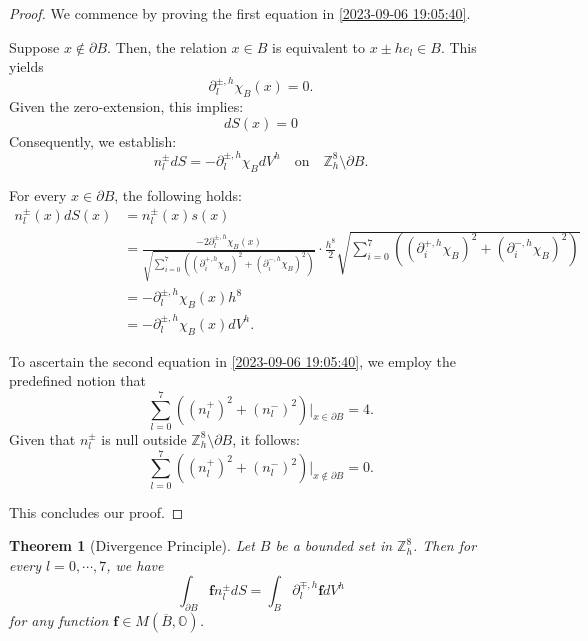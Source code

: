 \documentclass{amsart}
\newtheorem{theorem}{Theorem}[section]
\theoremstyle{definition}
\theoremstyle{remark}
\numberwithin{equation}{section}
\newcommand{\p}{\partial}
\newcommand{\OO}{\mathbb O}
\newcommand{\Z}{\mathbb Z}
\newcommand{\f}{\bm{f}}
\begin{document}
\begin{proof}
	We commence by proving the first equation in \eqref{2023-09-06 19:05:40}.
	
	Suppose $x \notin \p B$. Then, the relation $x \in B$ is equivalent to $x \pm he_l \in B$. This yields
	\begin{equation*}
		\p_l^{\pm,h} \chi_B(x) = 0.
	\end{equation*}
	Given the zero-extension, this implies:
	\begin{equation*}
		dS(x) = 0
	\end{equation*}
	Consequently, we establish:
	\begin{equation*}
		n_l^{\pm} dS = -\p_l^{\pm,h } \chi_B dV^h \quad \text{on} \quad \Z_h^8\setminus \p B.
	\end{equation*}
	
	For every $x \in \p B$, the following holds:
	\begin{align*}
		n_l^{\pm}(x)dS(x) &= n_l^{\pm}(x)s(x) \\
		&= \frac{-2\p_l^{\pm,h} \chi_B(x)}{\sqrt{\sum_{i=0}^{7} \left( (\p_i^{+,h}\chi_B)^2 + (\p_i^{-,h}\chi_B)^2 \right)}} \cdot \frac{h^8}{2}\sqrt{\sum_{i=0}^{7} \left( (\p_i^{+,h}\chi_B)^2 + (\p_i^{-,h}\chi_B)^2 \right)} \\
		&= -\p_l^{\pm,h}\chi_B(x)h^8 \\
		&= -\p_l^{\pm,h}\chi_B(x) dV^h.
	\end{align*}
	
	To ascertain the second equation in \eqref{2023-09-06 19:05:40}, we employ the predefined notion that
	\begin{equation*}
		\sum_{l=0}^{7} \left( (n_l^+)^2 + (n_l^-)^2 \right) \bigg|_{x\in \p B} = 4.
	\end{equation*}
	Given that $n_l^\pm$ is null outside $\Z^8_h\setminus \p B$, it follows:
	\begin{equation*}
		\sum_{l=0}^{7} \left( (n_l^+)^2 + (n_l^-)^2 \right) \bigg|_{x\notin \p B} = 0.
	\end{equation*}
	
	This concludes our proof.
\end{proof}






\begin{theorem}[Divergence Principle]\label{2023-09-06 21:25:07}
Let $B$ be a bounded set in  $\Z^8_h$. Then for every   $l=0,\cdots,7$, we have
	\begin{equation}
		\label{2023-09-06 20:18:53}
		\int_{\p B} \f n_l^{\pm} dS =\int_B \p^{\mp,h}_l \f dV^h
	\end{equation}
  for any function $\f \in M(\overline B, \OO)$.
\end{theorem}
\end{document}
